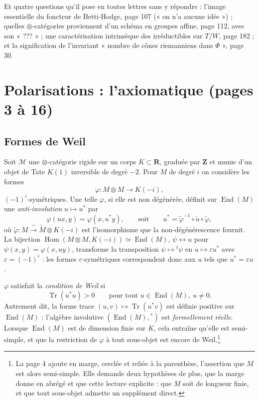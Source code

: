 \documentclass[11pt,a4paper]{article}
\begin{document}
Et quatre questions qu'il pose en toutes lettres sans y répondre : l'image
essentielle du foncteur de Betti-Hodge, page 107 (« on n'a aucune idée ») ;
quelles $\otimes$-catégories proviennent d'un schéma en groupes affine, page
112, avec son « ??? » ; une caractérisation intrinsèque des irréductibles sur
$T/W$, page 182 ; et la signification de l'invariant « nombre de cônes
riemanniens dans $\Phi$ », page 30.

\section*{Polarisations : l'axiomatique (pages 3 à 16)}

\subsection*{Formes de Weil}

Soit $\mathcal{M}$ une $\otimes$-catégorie rigide sur un corps $K \subset
\mathbf{R}$, graduée par $\mathbf{Z}$ et munie d'un objet de Tate $K(1)$
inversible de degré $-2$. Pour $M$ de degré $i$ on considère les formes
\[
\varphi \colon M \otimes M \longrightarrow K(-i) ,
\]
$(-1)^{i}$-symétriques. Une telle $\varphi$, si elle est non dégénérée,
définit sur $\operatorname{End}(M)$ une \emph{anti-involution} $u \mapsto
u^{*}$ par
\[
\varphi(ux, y) = \varphi(x, u^{*}y) ,
\qquad\text{soit}\qquad
u^{*} = \tilde{\varphi}^{-1} \circ \check{u} \circ \tilde{\varphi} ,
\]
où $\tilde{\varphi} \colon M \xrightarrow{\ \sim\ } \check{M} \otimes K(-i)$
est l'isomorphisme que la non-dégénérescence fournit. La bijection
$\operatorname{Hom}(M \otimes M, K(-i)) \simeq \operatorname{End}(M)$,
$\psi \leftrightarrow u$ pour $\psi(x,y) = \varphi(x, uy)$, transforme la
transposition $\psi \mapsto {}^{t}\psi$ en $u \mapsto \varepsilon u^{*}$ avec
$\varepsilon = (-1)^{i}$ : les formes $\varepsilon$-symétriques correspondent
donc aux $u$ tels que $u^{*} = \varepsilon u$.

$\varphi$ satisfait la \emph{condition de Weil} si
\[
\operatorname{Tr}(u^{*}u) > 0 \qquad\text{pour tout } u \in
\operatorname{End}(M) ,\ u \neq 0 .
\]
Autrement dit, la forme trace $(u,v) \mapsto \operatorname{Tr}(u^{*}v)$ est
définie positive sur $\operatorname{End}(M)$ : l'algèbre involutive
$(\operatorname{End}(M), {}^{*})$ est \emph{formellement réelle}. Lorsque
$\operatorname{End}(M)$ est de dimension finie sur $K$, cela entraîne qu'elle
est semi-simple, et que la restriction de $\varphi$ à tout sous-objet est
encore de Weil.\footnote{La page 4 ajoute en marge, cerclée et reliée à la
parenthèse, l'assertion que $M$ est alors semi-simple. Elle demande deux
hypothèses de plus, que la marge donne en abrégé et que cette lecture
explicite : que $M$ soit de longueur finie, et que tout sous-objet admette un
supplément direct.}
\end{document}
